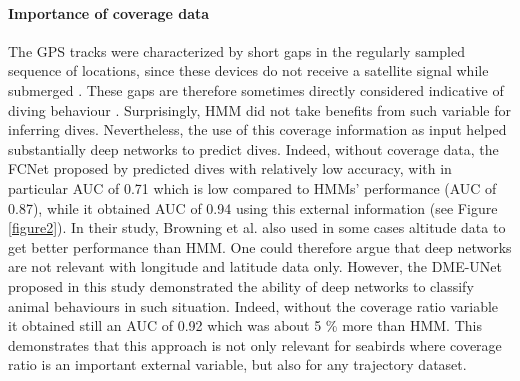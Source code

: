 \documentclass{article}
\begin{document}
\paragraph{Importance of coverage data}
The GPS tracks were characterized by short gaps in the regularly sampled sequence of locations, since these devices do not receive a satellite signal while submerged \citep{boyd_movement_2014,wilson_technological_2012}.
These gaps are therefore sometimes directly considered indicative of diving behaviour \citep{weimerskirch_foraging_2012}.
Surprisingly, HMM did not take benefits from such variable for inferring dives.
Nevertheless, the use of this coverage information as input helped substantially deep networks to predict dives.
Indeed, without coverage data, the FCNet proposed by \citep{browning_predicting_2018} predicted dives with relatively low accuracy, with in particular AUC of 0.71 which is low  compared to HMMs' performance (AUC of 0.87), while it obtained AUC of 0.94 using this external information (see Figure \ref{figure2}). In their study, Browning et al. also used in some cases altitude data to get better performance than HMM. One could therefore argue that deep networks are not relevant with longitude and latitude data only.
However, the DME-UNet proposed in this study demonstrated the ability of deep networks to classify animal behaviours in such situation. Indeed, without the coverage ratio variable it obtained still an AUC of 0.92 which was about 5 \% more than HMM. This demonstrates that this approach is not only relevant for seabirds where coverage ratio is an important external variable, but also for any trajectory dataset.
\end{document}
